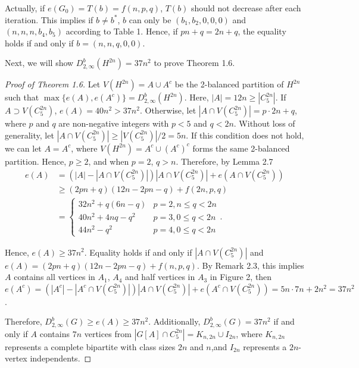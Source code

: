 \documentclass[11pt, oneside]{article}   	%
\begin{document}
\begin{remark}
    Actually, if $e(G_0)=T(b)=f(n,p,q)$, $T(b)$ should not decrease after each iteration. This implies if $b\neq b^*$, $b$ can only be $(b_1,b_2,0,0,0)$ and $(n,n,n,b_4,b_5)$ according to Table 1. Hence, if $pn+q=2n+q$, the equality holds if and only if $b=(n,n,q,0,0)$.
\end{remark}


Next, we will show $D_{2,\infty}^b(H^{2n})=37 n^2$ to prove Theorem 1.6.

\begin{proof}[Proof of Theorem 1.6]
   
    Let $V(H^{2n})=A\cup A^c$ be the 2-balanced partition of $H^{2n}$ such that $\max\{e(A), e(A^c)\} =D_{2,\infty}^b(H^{2n})$. Here, $|A|=12 n\geq |C_5^{2n}|$.  
    If $A\supset V(C_5^{2n})$, $e(A)=40n^2> 37n^2$.  
    Otherwise, let $|A\cap V(C_5^{2n})|=p\cdot 2n+ q$, where $p$ and $q$ are non-negative integers  with $p<5$ and $q<2n$. Without loss of generality, let $|A\cap V(C_5^{2n})|\geq |V(C_5^{2n})|/2 =5n$. If this condition does not hold, we can let $A = A^c$, where $V(H^{2n}) = A^c \cup (A^c)^c$ forms the same 2-balanced partition. Hence, $p\geq 2$, and when $p=2$, $q>n$.
    Therefore, by Lemma 2.7
    $$
    \begin{aligned}
        e(A)
        & = (|A|-|A\cap V(C_5^{2n})|)|A\cap V(C_5^{2n})|+e(A\cap V(C_5^{2n})) \\
        &\geq (2pn+q)(12n-2pn-q)+f(2n,p,q) \\
        &=\begin{cases}
        32n^2+q(6n-q) & p=2, n\leq q <2n  \\
        40n^2+4nq-q^2 & p=3, 0\leq q <2n  \\
        44n^2-q^2 & p=4, 0\leq q <2n
        \end{cases}.
    \end{aligned}
    $$
        
Hence, $e(A)\geq 37n^2$. Equality holds if and only if $|A\cap V(C_5^{2n})|$ and $e(A)=(2pn+q)(12n-2pn-q)+f(n,p,q)$. By Remark 2.3, this implies
$A$ contains all vertices in $A_1$, $A_4$ and half vertices in $A_3$ in Figure 2, then $e(A^c)=(|A^c|-|A^c\cap V(C_5^{2n})|)|A\cap V(C_5^{2n})|+e(A^c\cap V(C_5^{2n}))=5n\cdot7n+2n^2=37n^2$.

Therefore, $D_{2,\infty}^b(G)\geq e(A)\geq 37n^2$. Additionally, $D_{2,\infty}^b(G)=37n^2$ if and only if $A$ contains $7n$ vertices from $|G[A]\cap C_5^{2n}|=K_{n,2n}\cup I_{2n}$, where $K_{n,2n}$ represents a complete bipartite with class sizes $2n$ and $n$,and $I_{2n}$ represents a $2n$-vertex independents.
   
\end{proof}
\end{document}
